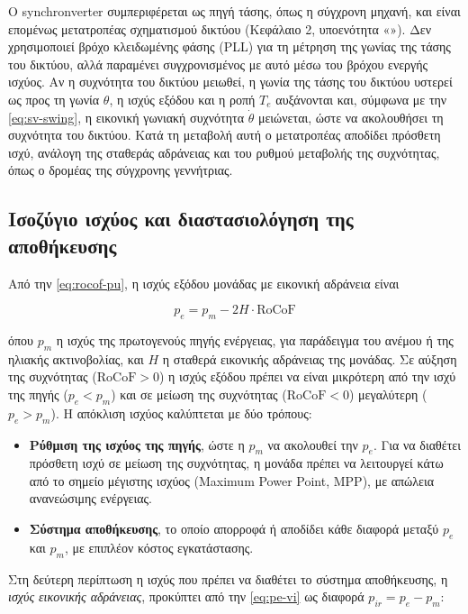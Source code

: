 Ο synchronverter συμπεριφέρεται ως πηγή τάσης, όπως η σύγχρονη μηχανή, και είναι επομένως
μετατροπέας σχηματισμού δικτύου (Κεφάλαιο 2, υποενότητα «»). Δεν
χρησιμοποιεί βρόχο κλειδωμένης φάσης (PLL) για τη μέτρηση της γωνίας της τάσης του δικτύου,
αλλά παραμένει συγχρονισμένος με αυτό μέσω του βρόχου ενεργής ισχύος. Αν η συχνότητα του
δικτύου μειωθεί, η γωνία της τάσης του δικτύου υστερεί ως προς τη γωνία $\theta$, η ισχύς
εξόδου και η ροπή $T_e$ αυξάνονται και, σύμφωνα με την \eqref{eq:sv-swing}, η εικονική γωνιακή
συχνότητα $\dot{\theta}$ μειώνεται, ώστε να ακολουθήσει τη συχνότητα του δικτύου. Κατά τη
μεταβολή αυτή ο μετατροπέας αποδίδει πρόσθετη ισχύ, ανάλογη της σταθεράς αδράνειας και του
ρυθμού μεταβολής της συχνότητας, όπως ο δρομέας της σύγχρονης γεννήτριας.

\subsection{Ισοζύγιο ισχύος και διαστασιολόγηση της αποθήκευσης}
\label{sec:vi-storage}

Από την \eqref{eq:rocof-pu}, η ισχύς εξόδου μονάδας με εικονική αδράνεια είναι

\begin{equation}
p_e = p_m - 2H \cdot \mathrm{RoCoF}
\label{eq:pe-vi}
\end{equation}

όπου $p_m$ η ισχύς της πρωτογενούς πηγής ενέργειας, για παράδειγμα του ανέμου ή της ηλιακής
ακτινοβολίας, και $H$ η σταθερά εικονικής αδράνειας της μονάδας. Σε αύξηση της συχνότητας
($\mathrm{RoCoF} > 0$) η ισχύς εξόδου πρέπει να είναι μικρότερη από την ισχύ της πηγής
($p_e < p_m$) και σε μείωση της συχνότητας ($\mathrm{RoCoF} < 0$) μεγαλύτερη ($p_e > p_m$).
Η απόκλιση ισχύος καλύπτεται με δύο τρόπους:

\begin{itemize}
\item \textbf{Ρύθμιση της ισχύος της πηγής}, ώστε η $p_m$ να ακολουθεί την $p_e$. Για να
      διαθέτει πρόσθετη ισχύ σε μείωση της συχνότητας, η μονάδα πρέπει να λειτουργεί κάτω από
      το σημείο μέγιστης ισχύος (Maximum Power Point, MPP), με απώλεια ανανεώσιμης ενέργειας.
\item \textbf{Σύστημα αποθήκευσης}, το οποίο απορροφά ή αποδίδει κάθε διαφορά μεταξύ $p_e$ και
      $p_m$, με επιπλέον κόστος εγκατάστασης.
\end{itemize}

Στη δεύτερη περίπτωση η ισχύς που πρέπει να διαθέτει το σύστημα αποθήκευσης, η \emph{ισχύς
εικονικής αδράνειας}, προκύπτει από την \eqref{eq:pe-vi} ως διαφορά $p_{ir} = p_e - p_m$:

